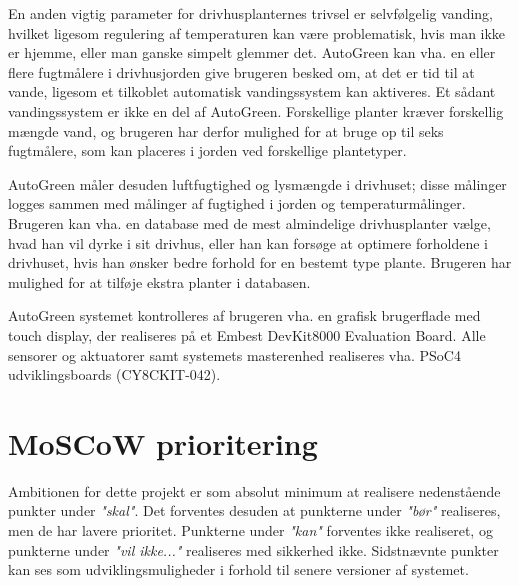 En anden vigtig parameter for drivhusplanternes trivsel er selvfølgelig vanding, hvilket ligesom regulering af temperaturen kan være problematisk, hvis man ikke er hjemme, eller man ganske simpelt glemmer det. 
AutoGreen kan vha. en eller flere fugtmålere i drivhusjorden give brugeren besked om, at det er tid til at vande, ligesom et tilkoblet automatisk vandingssystem kan aktiveres. Et sådant vandingssystem er ikke en del af AutoGreen.
Forskellige planter kræver forskellig mængde vand, og brugeren har derfor mulighed for at bruge op til seks fugtmålere, som kan placeres i jorden ved forskellige plantetyper. 

AutoGreen måler desuden luftfugtighed og lysmængde i drivhuset; disse målinger logges sammen med målinger af fugtighed i jorden og temperaturmålinger. 
Brugeren kan vha. en database med de mest almindelige drivhusplanter vælge, hvad han vil dyrke i sit drivhus, eller han kan forsøge at optimere forholdene i drivhuset, hvis han ønsker bedre forhold for en bestemt type plante.  
Brugeren har mulighed for at tilføje ekstra planter i databasen. 

AutoGreen systemet kontrolleres af brugeren vha. en grafisk brugerflade med touch display, der realiseres på et Embest DevKit8000 Evaluation Board. \cite{lib:DK8000}
Alle sensorer og aktuatorer samt systemets masterenhed realiseres vha. PSoC4 udviklingsboards (CY8CKIT-042). \cite{lib:psoc4_guide}

\clearpage

\section{MoSCoW prioritering}
Ambitionen for dette projekt er som absolut minimum at realisere nedenstående punkter under \textit{"skal"}. 
Det forventes desuden at punkterne under \textit{"bør"} realiseres, men de har lavere prioritet.
Punkterne under \textit{"kan"} forventes ikke realiseret, og punkterne under \textit{"vil ikke..."} realiseres med sikkerhed ikke. 
Sidstnævnte punkter kan ses som udviklingsmuligheder i forhold til senere versioner af systemet. 

